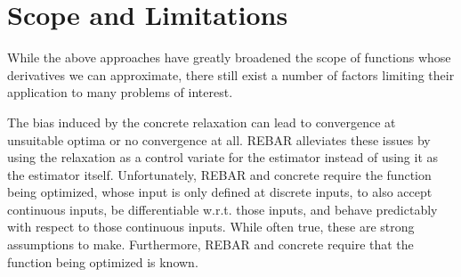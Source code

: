 \documentclass{article}
\begin{document}


\section{Scope and Limitations}
\label{limitations}
While the above approaches have greatly broadened the scope of functions whose derivatives we can approximate, there still exist a number of factors limiting their application to many problems of interest.

The bias induced by the concrete relaxation can lead to convergence at unsuitable optima or no convergence at all. REBAR alleviates these issues by using the relaxation as a control variate for the estimator instead of using it as the estimator itself. Unfortunately, REBAR and concrete require the function being optimized, whose input is only defined at discrete inputs, to also accept continuous inputs, be differentiable w.r.t. those inputs, and behave predictably with respect to those continuous inputs. While often true, these are strong assumptions to make. Furthermore, REBAR and concrete require that the function being optimized is known. 
\end{document}
